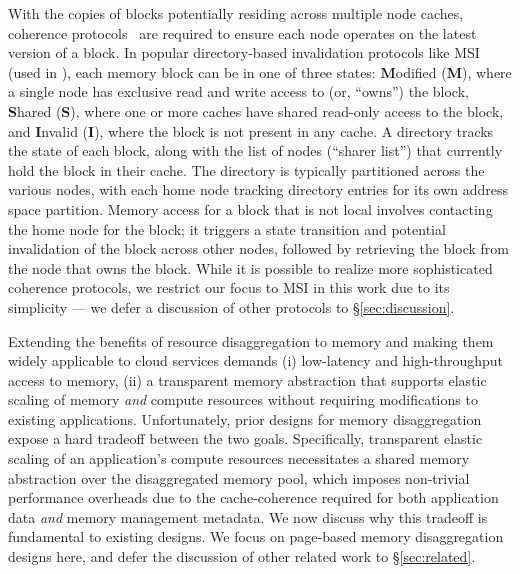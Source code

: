 With the copies of blocks potentially residing across multiple node caches, coherence protocols~\cite{msi, mesi, mesif, moesi, mosi} are required to ensure each node operates on the latest version of a block. In popular directory-based invalidation protocols like MSI~\cite{msi} (used in \mind), each memory block can be in one of three states: \textbf{M}odified (\textbf{M}), where a single node has exclusive read and write access to (or, ``owns'') the block, \textbf{S}hared (\textbf{S}), where one or more caches have shared read-only access to the block, and \textbf{I}nvalid (\textbf{I}), where the block is not present in any cache. A directory tracks the state of each block, along with the list of nodes (``sharer list'') that currently hold the block in their cache. The directory is typically partitioned across the various nodes, with each home node tracking directory entries for its own address space partition. Memory access for a block that is not local involves contacting the home node for the block; it triggers a state transition and potential invalidation of the block across other nodes, followed by retrieving the block from the node that owns the block. While it is possible to realize more sophisticated coherence protocols, we restrict our focus to MSI in this work due to its simplicity --- we defer a discussion of other protocols to \S\ref{sec:discussion}.

Extending the benefits of resource disaggregation to memory and making them widely applicable to cloud services demands (i) low-latency and high-throughput access to memory, (ii) a transparent memory abstraction that supports elastic scaling of memory \textit{and} compute resources without requiring modifications to existing applications. Unfortunately, prior designs for memory disaggregation expose a hard tradeoff between the two goals. Specifically, transparent elastic scaling of an application's compute resources necessitates a shared memory abstraction over the disaggregated memory pool, which imposes non-trivial performance overheads due to the cache-coherence required for both application data \textit{and} memory management metadata. We now discuss why this tradeoff is fundamental to existing designs. We focus on page-based memory disaggregation designs here, and defer the discussion of other related work to \S\ref{sec:related}.

